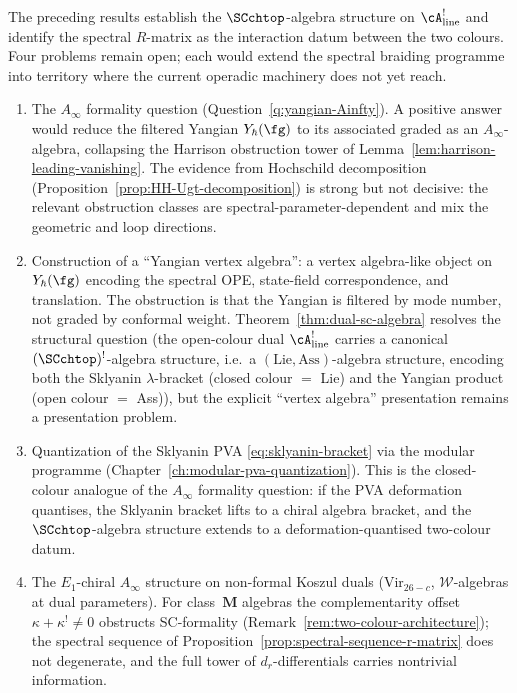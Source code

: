 \begin{remark}
\label{rem:yangian-E1-chiral-open}
The preceding results establish the $\SCchtop$-algebra structure
on $\cA^!_{\mathrm{line}}$ and identify the spectral $R$-matrix
as the interaction datum between the two colours. Four problems
remain open; each would extend the spectral braiding programme
into territory where the current operadic machinery does not
yet reach.
\begin{enumerate}[label=\textup{(\roman*)}]
\item The $A_\infty$ formality question
 (Question~\ref{q:yangian-Ainfty}). A positive answer would
 reduce the filtered Yangian $Y_\hbar(\fg)$ to its associated
 graded as an $A_\infty$-algebra, collapsing the Harrison
 obstruction tower of
 Lemma~\ref{lem:harrison-leading-vanishing}. The
 evidence from Hochschild decomposition
 (Proposition~\ref{prop:HH-Ugt-decomposition}) is strong
 but not decisive: the relevant obstruction classes are
 spectral-parameter-dependent and mix the geometric and loop
 directions.
\item Construction of a ``Yangian vertex algebra'': a vertex
 algebra-like object on $Y_\hbar(\fg)$ encoding the spectral
 OPE, state-field correspondence, and translation. The
 obstruction is that the Yangian is filtered by mode number, not
 graded by conformal weight. Theorem~\ref{thm:dual-sc-algebra}
 resolves the structural question (the open-colour dual
 $\cA^!_{\mathrm{line}}$ carries a canonical
 $(\SCchtop)^{!}$-algebra structure, i.e.\ a $(\mathrm{Lie},\mathrm{Ass})$-algebra
 structure, encoding both the Sklyanin
 $\lambda$-bracket (closed colour $=$ Lie) and the Yangian product
 (open colour $=$ Ass)), but the explicit ``vertex algebra''
 presentation remains a presentation problem.
\item Quantization of the Sklyanin PVA
 \eqref{eq:sklyanin-bracket} via the modular programme
 (Chapter~\ref{ch:modular-pva-quantization}). This is the
 closed-colour analogue of the $A_\infty$ formality question:
 if the PVA deformation quantises, the Sklyanin bracket
 lifts to a chiral algebra bracket, and the $\SCchtop$-algebra
 structure extends to a deformation-quantised two-colour datum.
\item The $E_1$-chiral $A_\infty$ structure on
 non-formal Koszul duals ($\mathrm{Vir}_{26-c}$,
 $\mathcal{W}$-algebras at dual parameters). For class~$\mathbf{M}$
 algebras the complementarity offset $\kappa + \kappa^! \neq 0$
 obstructs SC-formality
 (Remark~\ref{rem:two-colour-architecture}); the spectral
 sequence of
 Proposition~\ref{prop:spectral-sequence-r-matrix} does not
 degenerate, and the full tower of $d_r$-differentials carries
 nontrivial information.
\end{enumerate}
\end{remark}

